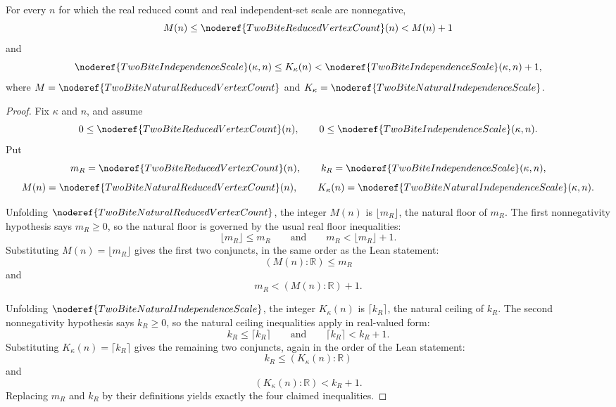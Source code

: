 \begin{lemma}
For every \(n\) for which the real reduced count and real independent-set scale
are nonnegative,
\[
M(n)\le \noderef{TwoBiteReducedVertexCount}(n)<M(n)+1
\]
and
\[
\noderef{TwoBiteIndependenceScale}(\kappa,n)
\le K_\kappa(n)
<\noderef{TwoBiteIndependenceScale}(\kappa,n)+1,
\]
where \(M=\noderef{TwoBiteNaturalReducedVertexCount}\) and
\(K_\kappa=\noderef{TwoBiteNaturalIndependenceScale}\).
\end{lemma}
\begin{proof}
Fix \(\kappa\) and \(n\), and assume
\[
0\le \noderef{TwoBiteReducedVertexCount}(n),
\qquad
0\le \noderef{TwoBiteIndependenceScale}(\kappa,n).
\]
Put
\[
m_R=\noderef{TwoBiteReducedVertexCount}(n),\qquad
k_R=\noderef{TwoBiteIndependenceScale}(\kappa,n),
\]
\[
M(n)=\noderef{TwoBiteNaturalReducedVertexCount}(n),
\qquad
K_\kappa(n)=\noderef{TwoBiteNaturalIndependenceScale}(\kappa,n).
\]

Unfolding \(\noderef{TwoBiteNaturalReducedVertexCount}\), the integer
\(M(n)\) is \(\lfloor m_R\rfloor\), the natural floor of \(m_R\).  The first
nonnegativity hypothesis says \(m_R\ge0\), so the natural floor is governed by
the usual real floor inequalities:
\[
\lfloor m_R\rfloor\le m_R
\qquad\text{and}\qquad
m_R<\lfloor m_R\rfloor+1.
\]
Substituting \(M(n)=\lfloor m_R\rfloor\) gives the first two conjuncts, in the
same order as the Lean statement:
\[
(M(n):\mathbb R)\le m_R
\]
and
\[
m_R<(M(n):\mathbb R)+1.
\]

Unfolding \(\noderef{TwoBiteNaturalIndependenceScale}\), the integer
\(K_\kappa(n)\) is \(\lceil k_R\rceil\), the natural ceiling of \(k_R\).  The
second nonnegativity hypothesis says \(k_R\ge0\), so the natural ceiling
inequalities apply in real-valued form:
\[
k_R\le \lceil k_R\rceil
\qquad\text{and}\qquad
\lceil k_R\rceil<k_R+1.
\]
Substituting \(K_\kappa(n)=\lceil k_R\rceil\) gives the remaining two conjuncts,
again in the order of the Lean statement:
\[
k_R\le (K_\kappa(n):\mathbb R)
\]
and
\[
(K_\kappa(n):\mathbb R)<k_R+1.
\]
Replacing \(m_R\) and \(k_R\) by their definitions yields exactly the four
claimed inequalities.
\end{proof}
